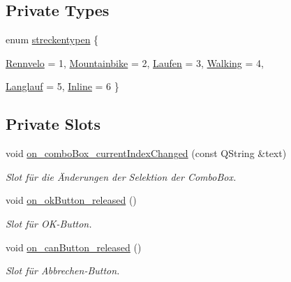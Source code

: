 \subsection*{Private Types}
\begin{CompactItemize}
\item 
enum \hyperlink{class_rechte_anpassen_cdf6e2c453add038a0ea629c094d07d9}{streckentypen} \{ \par
\hyperlink{class_rechte_anpassen_cdf6e2c453add038a0ea629c094d07d961be34a55e4958fdc1ac708c06d33d73}{Rennvelo} = 1, 
\hyperlink{class_rechte_anpassen_cdf6e2c453add038a0ea629c094d07d9b94aca80ae76dd93eccdd1297f5afb75}{Mountainbike} = 2, 
\hyperlink{class_rechte_anpassen_cdf6e2c453add038a0ea629c094d07d97096d37ac916e84fba291162e8139fe3}{Laufen} = 3, 
\hyperlink{class_rechte_anpassen_cdf6e2c453add038a0ea629c094d07d933a8a781894f8d20667c5da0d4811dec}{Walking} = 4, 
\par
\hyperlink{class_rechte_anpassen_cdf6e2c453add038a0ea629c094d07d9b82c95c6701e50cf5e17448e348cb0d0}{Langlauf} = 5, 
\hyperlink{class_rechte_anpassen_cdf6e2c453add038a0ea629c094d07d99566ec7584a007ac34a3d093d074c491}{Inline} = 6
 \}
\end{CompactItemize}
\subsection*{Private Slots}
\begin{CompactItemize}
\item 
void \hyperlink{class_rechte_anpassen_780aca60ab029d93d65f3a61804b68a6}{on\_\-comboBox\_\-currentIndexChanged} (const QString \&text)
\begin{CompactList}\small\item\em Slot für die Änderungen der Selektion der ComboBox. \item\end{CompactList}\item 
void \hyperlink{class_rechte_anpassen_511148f4cd870c9b42addd4eeb60f799}{on\_\-okButton\_\-released} ()
\begin{CompactList}\small\item\em Slot für OK-Button. \item\end{CompactList}\item 
void \hyperlink{class_rechte_anpassen_1ce3a9c5ff746deed0ce1e3d3fc15e32}{on\_\-canButton\_\-released} ()
\begin{CompactList}\small\item\em Slot für Abbrechen-Button. \item\end{CompactList}\end{CompactItemize}
